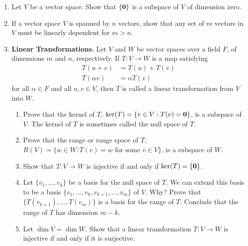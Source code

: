 {\begin{enumerate}
\item
Let $V$ be a vector space. Show that $\{ {\bold 0} \}$ is a subspace
of $V$ of dimension zero.


\item
If a vector space $V$ is spanned by $n$ vectors, show that any set of
$m$ vectors in $V$ must be linearly dependent for $m >n$.  


\item \label{vect:linear_transformation}
{\bf Linear Transformations.}
Let $V$ and $W$ be vector spaces over a field $F$, of dimensions $m$
and $n$, respectively. If $T: V \rightarrow W$ is a map satisfying
\begin{align*}
T( u+ v ) & =  T(u ) + T(v) \\
T( \alpha v ) & =  \alpha T(v)
\end{align*}
for all $\alpha \in F$ and all $u, v \in V$, then $T$ is called a
{\bfi linear transformation\/} from $V$ into $W$. 
\begin{enumerate}

   \item
Prove that the {\bfi kernel\/} of $T$, 
$\ker(T) = \{ v \in V : T(v) = 
{\bold 0} \}$, is a subspace of $V$. The kernel of $T$ is sometimes
called the {\bfi null space\/} of $T$. 

   \item
Prove that the {\bfi range\/} or
{\bfi range space\/} of $T$, $R(V) = \{ w \in W : T(v) = w \mbox{ for
some $v \in V$} \}$, is a subspace of $W$. 

   \item
Show that $T : V \rightarrow W$ is injective if and only if 
$\ker(T) = \{ \bold 0 \}$.

   \item
Let $\{ v_1, \ldots, v_k \}$ be a basis for the null space of $T$. We
can extend this basis to be a basis $\{ v_1, \ldots, v_k, v_{k+1},
\ldots, v_m\}$ of $V$. Why?  Prove that $\{ T(v_{k+1}), \ldots, T(v_m)
\}$ is a basis for the range of $T$. Conclude that the range of $T$
has dimension $m-k$.

   \item
Let $\dim V = \dim W$.  Show that a linear transformation $T : V
\rightarrow W$ is injective if and only if it is surjective.


\end{enumerate}
\end{enumerate}}
